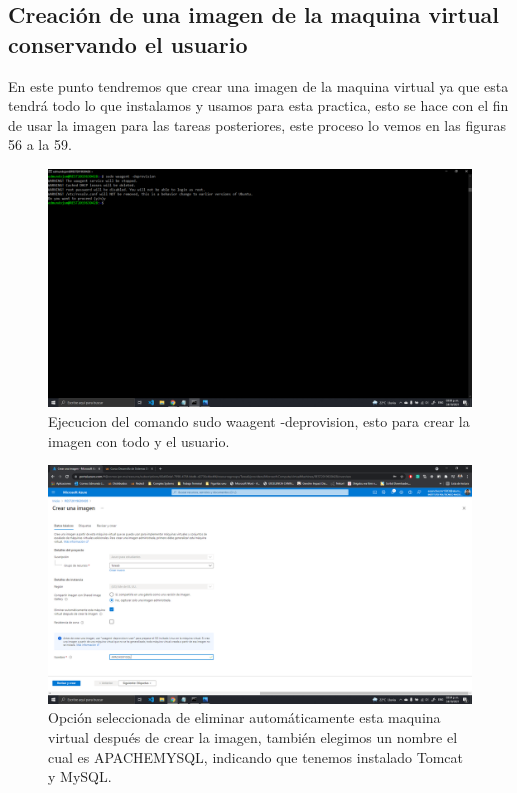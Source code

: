 \documentclass[11pt]{article}
\begin{document}
		\subsection{Creación de una imagen de la maquina virtual conservando el usuario}
		En este punto tendremos que crear una imagen de la maquina virtual ya que esta tendrá todo lo que instalamos y usamos para esta practica, esto se hace con el fin de usar la imagen para las tareas posteriores, este proceso lo vemos en las figuras 56 a la 59.
		\begin{figure}[H]
			\centering
			\includegraphics[scale=0.34]{resources/imagenvm1.png}
			\caption{Ejecucion del comando sudo waagent -deprovision, esto para crear la imagen con todo y el usuario.}\label{fig:picture}
		\end{figure}
		\begin{figure}[H]
			\centering
			\includegraphics[scale=0.34]{resources/imagenvm2.png}
			\caption{Opción seleccionada de eliminar automáticamente esta maquina virtual después de crear la imagen, también elegimos un nombre el cual es APACHEMYSQL, indicando que tenemos instalado Tomcat y MySQL.}\label{fig:picture}
		\end{figure}
\end{document}
